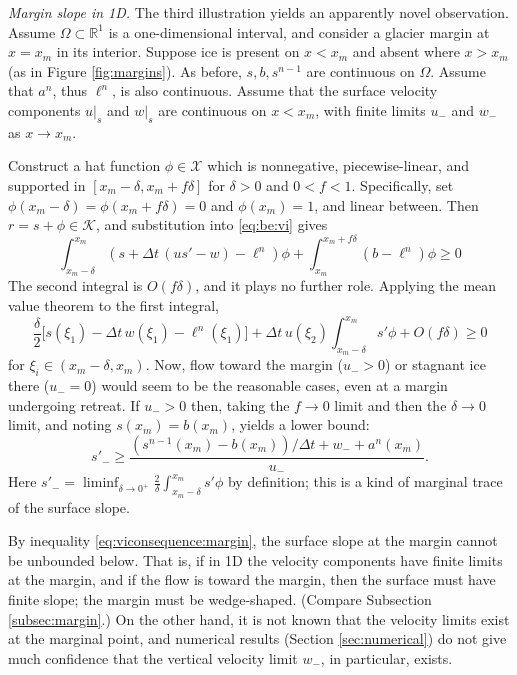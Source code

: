 \documentclass[hidelinks,onefignum,onetabnum,final]{siamart220329}  %
\newcommand{\RR}{\mathbb{R}}
\newcommand{\cK}{\mathcal{K}}
\newcommand{\cX}{\mathcal{X}}
\begin{document}
\smallskip
\emph{Margin slope in 1D.}  The third illustration yields an apparently novel observation.  Assume $\Omega \subset \RR^1$ is a one-dimensional interval, and consider a glacier margin at $x=x_m$ in its interior.  Suppose ice is present on $x<x_m$ and absent where $x>x_m$ (as in Figure \ref{fig:margins}).  As before, $s,b,s^{n-1}$ are continuous on $\Omega$.  Assume that $a^n$, thus $\ell^n$, is also continuous.  Assume that the surface velocity components $u|_s$ and $w|_s$ are continuous on $x<x_m$, with finite limits $u_-$ and $w_-$ as $x\to x_m$.

Construct a hat function $\phi\in\cX$ which is nonnegative, piecewise-linear, and supported in $[x_m-\delta,x_m+f\delta]$ for $\delta>0$ and $0<f<1$.  Specifically, set $\phi(x_m-\delta)=\phi(x_m+f\delta)=0$ and $\phi(x_m)=1$, and linear between.  Then $r=s+\phi\in\cK$, and substitution into \eqref{eq:be:vi} gives
\begin{equation}
\int_{x_m-\delta}^{x_m} \left(s + \Delta t\, (u s' - w) - \ell^n\right)\phi + \int_{x_m}^{x_m+f\delta} \left(b - \ell^n\right)\phi \ge 0
\end{equation}
The second integral is $O(f\delta)$, and it plays no further role.  Applying the mean value theorem to the first integral,
\begin{equation}
\frac{\delta}{2} \big[s(\xi_1) - \Delta t\,w(\xi_1) - \ell^n(\xi_1)\big] + \Delta t\,u(\xi_2) \int_{x_m-\delta}^{x_m} s'\phi + O(f\delta) \ge 0 \label{eq:viconsequence:margin:early}
\end{equation}
for $\xi_i \in (x_m-\delta,x_m)$.  Now, flow toward the margin ($u_->0$) or stagnant ice there ($u_-=0$) would seem to be the reasonable cases, even at a margin undergoing retreat.  If $u_->0$ then, taking the $f\to 0$ limit and then the $\delta \to 0$ limit, and noting $s(x_m)=b(x_m)$, yields a lower bound:
\begin{equation}
s'_- \ge \frac{(s^{n-1}(x_m)-b(x_m))/\Delta t + w_- + a^n(x_m)}{u_-}. \label{eq:viconsequence:margin}
\end{equation}
Here $s'_- = \liminf_{\delta \to 0^+} \frac{2}{\delta} \int_{x_m-\delta}^{x_m} s'\phi$ by definition; this is a kind of marginal trace of the surface slope.

By inequality \eqref{eq:viconsequence:margin}, the surface slope at the margin cannot be unbounded below.  That is, if in 1D the velocity components have finite limits at the margin, and if the flow is toward the margin, then the surface must have finite slope; the margin must be wedge-shaped.  (Compare Subsection \ref{subsec:margin}.)  On the other hand, it is not known that the velocity limits exist at the marginal point, and numerical results (Section \ref{sec:numerical}) do not give much confidence that the vertical velocity limit $w_-$, in particular, exists.
\end{document}
